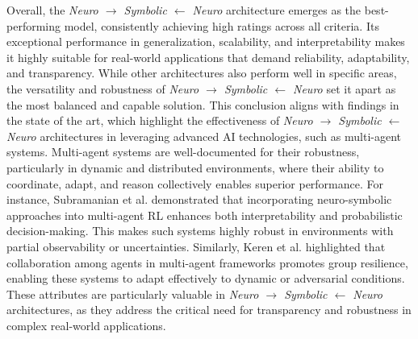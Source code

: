 \documentclass[12pt]{article}
\begin{document}
Overall, the \textit{Neuro $\to$ Symbolic $\leftarrow$ Neuro} architecture emerges as the best-performing model, consistently achieving high ratings across all criteria. Its exceptional performance in generalization, scalability, and interpretability makes it highly suitable for real-world applications that demand reliability, adaptability, and transparency. While other architectures also perform well in specific areas, the versatility and robustness of \textit{Neuro $\to$ Symbolic $\leftarrow$ Neuro} set it apart as the most balanced and capable solution. This conclusion aligns with findings in the state of the art, which highlight the effectiveness of \textit{Neuro $\to$ Symbolic $\leftarrow$ Neuro} architectures in leveraging advanced AI technologies, such as multi-agent systems. Multi-agent systems are well-documented for their robustness, particularly in dynamic and distributed environments, where their ability to coordinate, adapt, and reason collectively enables superior performance. For instance, Subramanian et al. \cite{subramanian2024neuro} demonstrated that incorporating neuro-symbolic approaches into multi-agent RL enhances both interpretability and probabilistic decision-making. This makes such systems highly robust in environments with partial observability or uncertainties. Similarly, Keren et al.  \cite{keren2021collaboration} highlighted that collaboration among agents in multi-agent frameworks promotes group resilience, enabling these systems to adapt effectively to dynamic or adversarial conditions. These attributes are particularly valuable in \textit{Neuro $\to$ Symbolic $\leftarrow$ Neuro} architectures, as they address the critical need for transparency and robustness in complex real-world applications.


\end{document}
